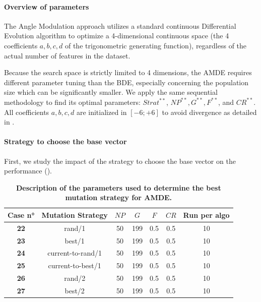 \documentclass[12pt, openany]{article}
\begin{document}
\paragraph{Overview of parameters} The Angle Modulation approach utilizes a standard continuous Differential Evolution algorithm to optimize a 4-dimensional continuous space (the 4 coefficients $a, b, c, d$ of the trigonometric generating function), regardless of the actual number of features in the dataset.

Because the search space is strictly limited to 4 dimensions, the AMDE requires different parameter tuning than the BDE, especially concerning the population size which can be significantly smaller. We apply the same sequential methodology to find its optimal parameters: $Strat^{**}$, $NP^{**}, G^{**}, F^{**}$, and $CR^{**}$. All coefficients $a,b,c,d$ are initialized in $[-6;+6]$ to avoid divergence as detailed in \cite{1688535}.

\paragraph{Strategy to choose the base vector}

First, we study the impact of the strategy to choose the base vector on the performance ().

\begin{table}[H]
    \centering
    \renewcommand{\arraystretch}{1.5}
    \begin{tabular}{|c|c|c|c|c|c|c|}
        \hline 
        \textbf{Case n°} & \textbf{Mutation Strategy} & $NP$ & $G$ & $F$ & $CR$ & \textbf{Run per algo} \\ \hline

        \textbf{22} & rand/1 & 50 & 199 & 0.5 & 0.5 & 10 \\ \hdashline
        \textbf{23} & best/1 & 50 & 199 & 0.5 & 0.5 & 10 \\ \hdashline
        \textbf{24} & current-to-rand/1 & 50 & 199 & 0.5 & 0.5 & 10 \\ \hdashline
        \textbf{25} & current-to-best/1 & 50 & 199 & 0.5 & 0.5 & 10 \\ \hdashline
        \textbf{26} & rand/2 & 50 & 199 & 0.5 & 0.5 & 10 \\ \hdashline
        \textbf{27} & best/2 & 50 & 199 & 0.5 & 0.5 & 10 \\ 
        \hline
    \end{tabular}
    \caption{\textbf{Description of the parameters used to determine the best mutation strategy for AMDE.}}
    \label{tab:Cases_Determine_AMDE_Strategy}
\end{table}
\end{document}
